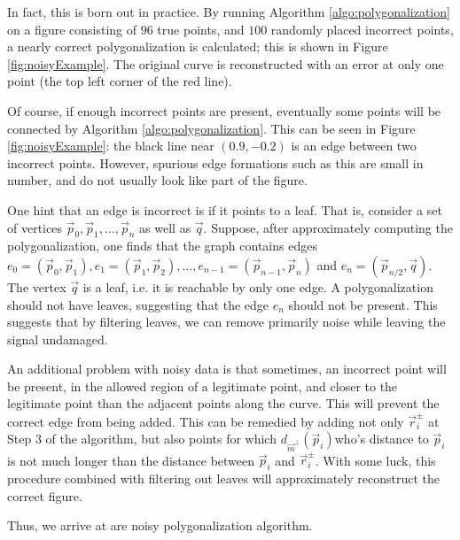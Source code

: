 \documentclass{article}
\numberwithin{cntr}{section}
\numberwithin{equation}{section}
\newcommand{\vp}[0]{{\vec{p}}}
\newcommand{\vq}[0]{{\vec{q}}}
\newcommand{\vr}[0]{{\vec{r}}}
\newcommand{\vm}[0]{{\vec{m}}}
\begin{document}
In fact, this is born out in practice. By running Algorithm \ref{algo:polygonalization} on a figure consisting of $96$ true points, and $100$ randomly placed incorrect points, a nearly correct polygonalization is calculated; this is shown in Figure \ref{fig:noisyExample}. The original curve is reconstructed with an error at only one point (the top left corner of the red line).

Of course, if enough incorrect points are present, eventually some points will be connected by Algorithm \ref{algo:polygonalization}. This can be seen in Figure \ref{fig:noisyExample}: the black line near $(0.9, -0.2)$ is an edge between two incorrect points. However, spurious edge formations such as this are small in number, and do not usually look like part of the figure.

One hint that an edge is incorrect is if it points to a leaf. That is, consider a set of vertices $\vp_{0}, \vp_{1}, \ldots, \vp_{n}$ as well as $\vq$. Suppose, after approximately computing the polygonalization, one finds that the graph contains edges $e_{0} = (\vp_{0}, \vp_{1}), e_{1} = (\vp_{1}, \vp_{2}), \ldots, e_{n-1} = (\vp_{n-1}, \vp_{n})$ and $e_{n} = (\vp_{n/2}, \vq)$. The vertex $\vq$ is a leaf, i.e. it is reachable by only one edge. A polygonalization should not have leaves, suggesting that the edge $e_{n}$ should not be present. This suggests that by filtering leaves, we can remove primarily noise while leaving the signal undamaged.

An additional problem with noisy data is that sometimes, an incorrect point will be present, in the allowed region of a legitimate point, and closer to the legitimate point than the adjacent points along the curve. This will prevent the correct edge from being added. This can be remedied by adding not only $\vr_{i}^{\pm}$ at Step 3 of the algorithm, but also points for which $d_{\vm^{\perp}}(\vp_{i})$who's distance to $\vp_{i}$ is not much longer than the distance between $\vp_{i}$ and $\vr_{i}^{\pm}$. With some luck, this procedure combined with filtering out leaves will approximately reconstruct the correct figure.

Thus, we arrive at are noisy polygonalization algorithm.
\end{document}
